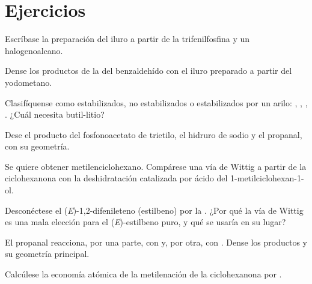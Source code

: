 \section{Ejercicios}

\begin{exercise}[$\star$]\label{exo:b2:wittig:1}
Escríbase la preparación del iluro  a partir de la trifenilfosfina y un halogenoalcano.
\end{exercise}

\begin{exercise}[$\star$]\label{exo:b2:wittig:2}
Dense los productos de la  del benzaldehído con el iluro preparado a partir del yodometano.
\end{exercise}

\begin{exercise}[$\star$]\label{exo:b2:wittig:3}
Clasifíquense como estabilizados, no estabilizados o estabilizados por un arilo: , ,
, . ¿Cuál necesita butil-litio?
\end{exercise}

\begin{exercise}[$\star$]\label{exo:b2:wittig:4}
Dese el producto del fosfonoacetato de trietilo, el hidruro de sodio y el propanal, con su geometría.
\end{exercise}

\begin{exercise}[$\star\star$]\label{exo:b2:wittig:5}
Se quiere obtener metilenciclohexano. Compárese una vía de Wittig a partir de la ciclohexanona con la deshidratación
catalizada por ácido del 1-metilciclohexan-1-ol.
\end{exercise}

\begin{exercise}[$\star\star$]\label{exo:b2:wittig:6}
Desconéctese el (\textit{E})-1,2-difenileteno (estilbeno) por la . ¿Por qué la vía de Wittig
es una mala elección para el (\textit{E})-estilbeno puro, y qué se usaría en su lugar?
\end{exercise}

\begin{exercise}[$\star\star$]\label{exo:b2:wittig:7}
El propanal reacciona, por una parte, con  y, por otra, con . Dense los
productos y su geometría principal.
\end{exercise}

\begin{exercise}[$\star\star$]\label{exo:b2:wittig:8}
Calcúlese la economía atómica de la metilenación de la ciclohexanona por .
\end{exercise}

